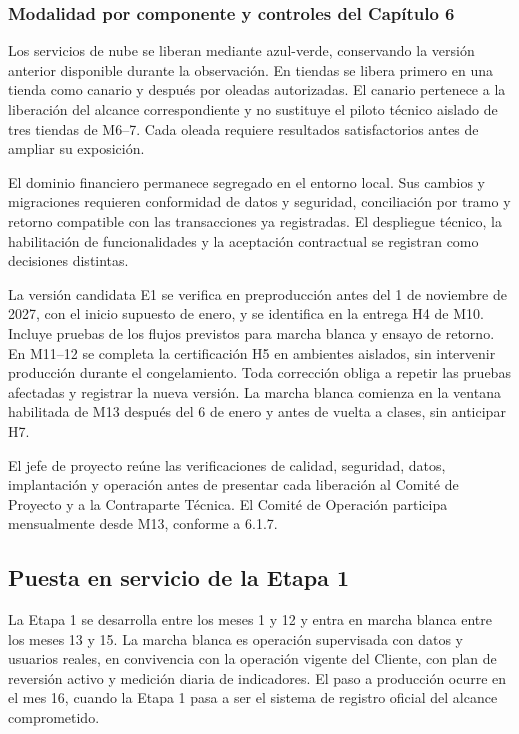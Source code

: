 \documentclass[11pt]{article}
\begin{document}
\subsubsection*{Modalidad por componente y controles del Capítulo 6}

Los servicios de nube se liberan mediante azul-verde, conservando la versión anterior disponible durante la observación. En tiendas se libera primero en una tienda como canario y después por oleadas autorizadas. El canario pertenece a la liberación del alcance correspondiente y no sustituye el piloto técnico aislado de tres tiendas de M6–7. Cada oleada requiere resultados satisfactorios antes de ampliar su exposición.

El dominio financiero permanece segregado en el entorno local. Sus cambios y migraciones requieren conformidad de datos y seguridad, conciliación por tramo y retorno compatible con las transacciones ya registradas. El despliegue técnico, la habilitación de funcionalidades y la aceptación contractual se registran como decisiones distintas.

La versión candidata E1 se verifica en preproducción antes del 1 de noviembre de 2027, con el inicio supuesto de enero, y se identifica en la entrega H4 de M10. Incluye pruebas de los flujos previstos para marcha blanca y ensayo de retorno. En M11–12 se completa la certificación H5 en ambientes aislados, sin intervenir producción durante el congelamiento. Toda corrección obliga a repetir las pruebas afectadas y registrar la nueva versión. La marcha blanca comienza en la ventana habilitada de M13 después del 6 de enero y antes de vuelta a clases, sin anticipar H7.

El jefe de proyecto reúne las verificaciones de calidad, seguridad, datos, implantación y operación antes de presentar cada liberación al Comité de Proyecto y a la Contraparte Técnica. El Comité de Operación participa mensualmente desde M13, conforme a 6.1.7.

\subsection*{Puesta en servicio de la Etapa 1}

La Etapa 1 se desarrolla entre los meses 1 y 12 y entra en marcha blanca entre los meses 13 y 15. La marcha blanca es operación supervisada con datos y usuarios reales, en convivencia con la operación vigente del Cliente, con plan de reversión activo y medición diaria de indicadores. El paso a producción ocurre en el mes 16, cuando la Etapa 1 pasa a ser el sistema de registro oficial del alcance comprometido.
\end{document}
